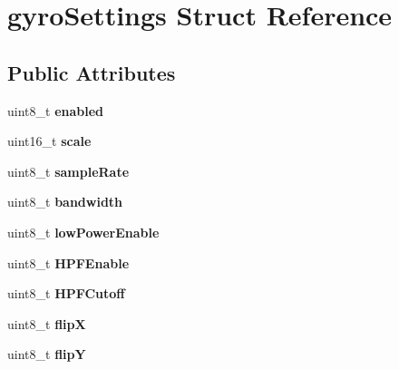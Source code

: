 \hypertarget{structgyroSettings}{}\section{gyro\+Settings Struct Reference}
\label{structgyroSettings}
\subsection*{Public Attributes}
\begin{DoxyCompactItemize}
\item 
\mbox{\label{structgyroSettings_ac9c769eeefed971baac74a7b81b25e7b}} 
uint8\+\_\+t {\bfseries enabled}
\item 
\mbox{\label{structgyroSettings_a70ced5c47e97d4dd6770954117ad3a9f}} 
uint16\+\_\+t {\bfseries scale}
\item 
\mbox{\label{structgyroSettings_a58ebac4d1f242d6b129570396a7355b0}} 
uint8\+\_\+t {\bfseries sample\+Rate}
\item 
\mbox{\label{structgyroSettings_ac3f0782333ec55165c1f589d445ba374}} 
uint8\+\_\+t {\bfseries bandwidth}
\item 
\mbox{\label{structgyroSettings_a296a167235d876fa79afc471399e763b}} 
uint8\+\_\+t {\bfseries low\+Power\+Enable}
\item 
\mbox{\label{structgyroSettings_aa7aa5eba55588e4bcfc0be9ea9b6ed8d}} 
uint8\+\_\+t {\bfseries H\+P\+F\+Enable}
\item 
\mbox{\label{structgyroSettings_a7357a9b858fdf515e969ae4e06459f37}} 
uint8\+\_\+t {\bfseries H\+P\+F\+Cutoff}
\item 
\mbox{\label{structgyroSettings_a877b529e39287bed155acbca97a75540}} 
uint8\+\_\+t {\bfseries flipX}
\item 
\mbox{\label{structgyroSettings_a2137659e07899a0efccc941e003c07e0}} 
uint8\+\_\+t {\bfseries flipY}
\item 
\mbox{\label{structgyroSettings_a94c92be9f7c56dd9cd21120307d7373f}} 

\end{DoxyCompactItemize}
